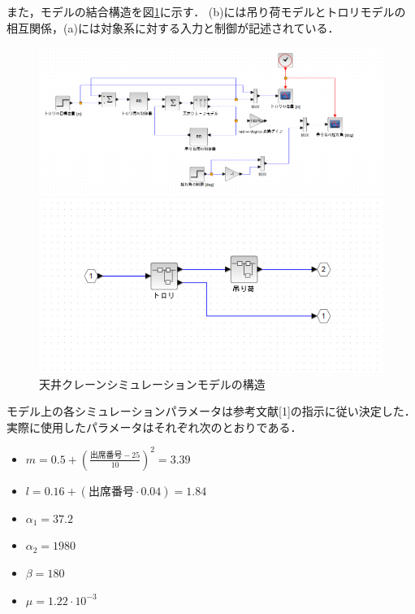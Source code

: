 \documentclass[dvipdfmx,titlepage,a4j]{jsarticle}  %
\begin{document}
また，モデルの結合構造を図\ref{fig:crane:model1}に示す．
(b)には吊り荷モデルとトロリモデルの相互関係，(a)には対象系に対する入力と制御が記述されている．

\begin{figure}[H]
  \begin{minipage}{10cm}
    \centering
    \includegraphics[keepaspectratio, scale=0.45]{../graph/ex-model.png}
  \end{minipage}
  \hfill
  \begin{minipage}{6cm}
    \centering
    \includegraphics[keepaspectratio, scale=0.5]{../graph/ex-model-2.png}
  \end{minipage}
  \caption{天井クレーンシミュレーションモデルの構造}
  \label{fig:crane:model1}
\end{figure}

モデル上の各シミュレーションパラメータは参考文献[1]の指示に従い決定した．
実際に使用したパラメータはそれぞれ次のとおりである．
\begin{itemize}
  \item $m = 0.5 + (\frac{出席番号 - 25}{10})^2 = 3.39$
  \item $l = 0.16 + (出席番号 \cdot 0.04) = 1.84$
  \item $\alpha_1 = 37.2$
  \item $\alpha_2 = 1980$
  \item $\beta = 180$
  \item $\mu = 1.22 \cdot  10^{-3}$
\end{itemize}
\end{document}
